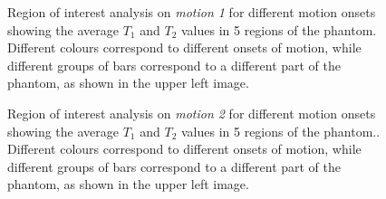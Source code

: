 \begin{figure}[ht]
    \caption{Region of interest analysis on \textit{motion 1} for different motion onsets showing the average $T_1$ and $T_2$ values in 5 regions of the phantom.
    Different colours correspond to different onsets of motion, while different groups of bars correspond to a different part of the phantom, as shown in the upper left image.}
    \label{fig:appendixmotion1ROI}
\end{figure}

\begin{figure}[ht]
    \caption{Region of interest analysis on \textit{motion 2} for different motion onsets showing the average $T_1$ and $T_2$ values in 5 regions of the phantom..
    Different colours correspond to different onsets of motion, while different groups of bars correspond to a different part of the phantom, as shown in the upper left image.}
    \label{fig:appendixmotion2ROI}
\end{figure}

